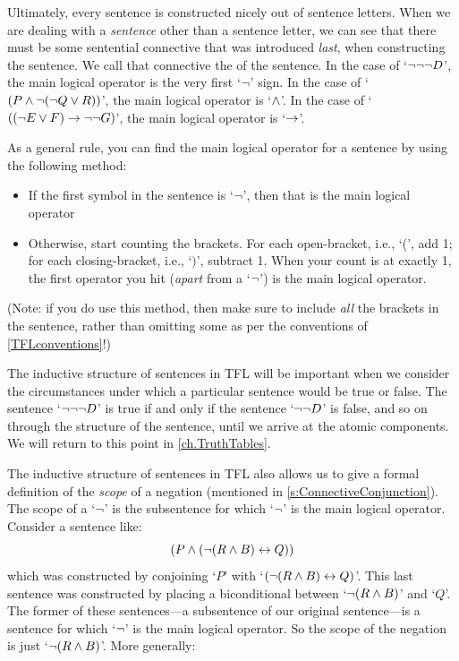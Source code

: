 Ultimately, every sentence is constructed nicely out of sentence letters. When we are dealing with a \emph{sentence} other than a sentence letter, we can see that there must be some sentential connective that was introduced \emph{last}, when constructing the sentence. We call that connective the  of the sentence. In the case of `$\neg\neg\neg D$', the main logical operator is the very first `$\neg$' sign. In the case of `$(P \wedge \neg (\neg Q \vee R))$', the main logical operator is `$\wedge$'. In the case of `$((\neg E \vee F) \rightarrow \neg\neg G)$', the main logical operator is `$\rightarrow$'.

As a general rule, you can find the main logical operator for a sentence by using the following method:
\begin{itemize}
	\item If the first symbol in the sentence is `$\neg$', then that is the main logical operator
	\item Otherwise, start counting the brackets. For each open-bracket, i.e., `(', add 1; for each closing-bracket, i.e., `$)$', subtract 1. When your count is at exactly 1, the first operator you hit (\emph{apart} from a `$\neg$') is the main logical operator.
\end{itemize}

(Note: if you do use this method, then make sure to include \emph{all} the brackets in the sentence, rather than omitting some as per the conventions of \cref{TFLconventions}!)

The inductive structure of sentences in TFL will be important when we consider the circumstances under which a particular sentence would be true or false. The sentence `$\neg \neg \neg D$' is true if and only if the sentence `$\neg \neg D$' is false, and so on through the structure of the sentence, until we arrive at the atomic components. We will return to this point in \cref{ch.TruthTables}.

The inductive structure of sentences in TFL also allows us to give a formal definition of the \emph{scope} of a negation (mentioned in \cref{s:ConnectiveConjunction}). The scope of a `$\neg$' is the subsentence for which `$\neg$' is the main logical operator. Consider a sentence like:
$$(P \wedge (\neg (R \wedge B) \leftrightarrow Q))$$
which was constructed by conjoining `$P$' with `$ (\neg (R \wedge B) \leftrightarrow Q)$'. This last sentence was constructed by placing a biconditional between `$\neg (R \wedge B)$' and `$Q$'. The former of these sentences---a subsentence of our original sentence---is a sentence for which `$\neg$' is the main logical operator. So the scope of the negation is just `$\neg(R \wedge B)$'. More generally:


